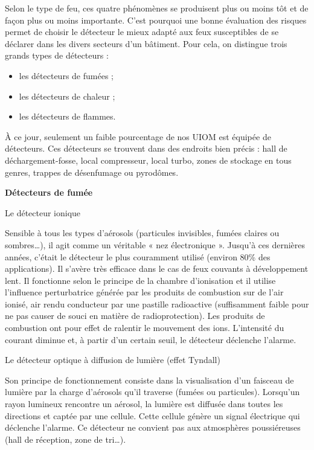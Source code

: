Selon le type de feu, ces quatre phénomènes se produisent plus ou moins tôt et de façon plus ou moins importante. C’est pourquoi une bonne évaluation des risques permet de choisir le détecteur le mieux adapté aux feux susceptibles de se déclarer dans les divers secteurs d’un bâtiment. Pour cela, on distingue trois grands types de détecteurs :

\begin{itemize}
\item  les détecteurs de fumées ;
\item  les détecteurs de chaleur ;
\item  les détecteurs de flammes.
\end{itemize}

À ce jour, seulement un faible pourcentage de nos UIOM est équipée de détecteurs. Ces détecteurs se trouvent dans des endroits bien précis : hall de déchargement-fosse, local compresseur, local turbo, zones de stockage en tous genres, trappes de désenfumage ou pyrodômes.

\vspace{0.3cm}
\textbf{Détecteurs de fumée}
\vspace{0.3cm}

Le détecteur ionique
\vspace{0.3cm}

Sensible à tous les types d’aérosols (particules invisibles, fumées claires ou sombres…), il agit comme un véritable « nez électronique ». Jusqu’à ces dernières années, c’était le détecteur le plus couramment utilisé (environ 80\% des applications). Il s’avère très efficace dans le cas de feux couvants à développement lent. Il fonctionne selon le principe de la chambre d’ionisation et il utilise l’influence perturbatrice générée par les produits de combustion sur de l’air ionisé, air rendu conducteur par une pastille radioactive (suffisamment faible pour ne pas causer de souci en matière de radioprotection). Les produits de combustion ont pour effet de ralentir le mouvement des ions. L’intensité du courant diminue et, à partir d’un certain seuil, le détecteur déclenche l’alarme.

Le détecteur optique à diffusion de lumière (effet Tyndall)
\vspace{0.3cm}

Son principe de fonctionnement consiste dans la visualisation d’un faisceau de lumière par la charge d’aérosols qu’il traverse (fumées ou particules). Lorsqu’un rayon lumineux rencontre un aérosol, la lumière est diffusée dans toutes les directions et captée par une cellule. Cette cellule génère un signal électrique qui déclenche l’alarme. 
Ce détecteur ne convient pas aux atmosphères poussiéreuses (hall de réception, zone de tri…).

